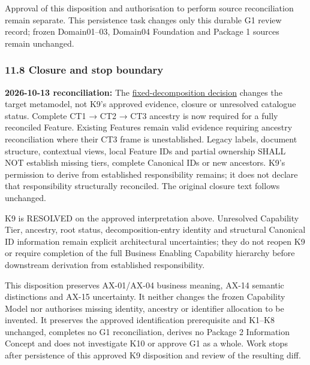 Approval of this disposition and authorisation to perform source reconciliation remain separate. This persistence task changes only this durable G1 review record; frozen Domain01–03, Domain04 Foundation and Package 1 sources remain unchanged.

\label{rad:k9:1482}
\subsubsection*{11.8 Closure and stop boundary}
\label{rad:k9:1484}

\textbf{2026-10-13 reconciliation:} The \href{https://github.com/fhirfactory/harmonia/blob/98410db60155198a75f74c79d98060070209faa1/docs/markdown/02-strategy/reviews/fixed-capability-decomposition-decision.md}{fixed-decomposition decision} changes the target metamodel, not K9's approved evidence, closure or unresolved catalogue status. Complete CT1 → CT2 → CT3 ancestry is now required for a fully reconciled Feature. Existing Features remain valid evidence requiring ancestry reconciliation where their CT3 frame is unestablished. Legacy labels, document structure, contextual views, local Feature IDs and partial ownership SHALL NOT establish missing tiers, complete Canonical IDs or new ancestors. K9's permission to derive from established responsibility remains; it does not declare that responsibility structurally reconciled. The original closure text follows unchanged.

\label{rad:k9:1495}

K9 is RESOLVED on the approved interpretation above. Unresolved Capability Tier, ancestry, root status, decomposition-entry identity and structural Canonical ID information remain explicit architectural uncertainties; they do not reopen K9 or require completion of the full Business Enabling Capability hierarchy before downstream derivation from established responsibility.

\label{rad:k9:1497}

This disposition preserves AX-01/\allowbreak{}AX-04 business meaning, AX-14 semantic distinctions and AX-15 uncertainty. It neither changes the frozen Capability Model nor authorises missing identity, ancestry or identifier allocation to be invented. It preserves the approved identification prerequisite and K1–K8 unchanged, completes no G1 reconciliation, derives no Package 2 Information Concept and does not investigate K10 or approve G1 as a whole. Work stops after persistence of this approved K9 disposition and review of the resulting diff.

